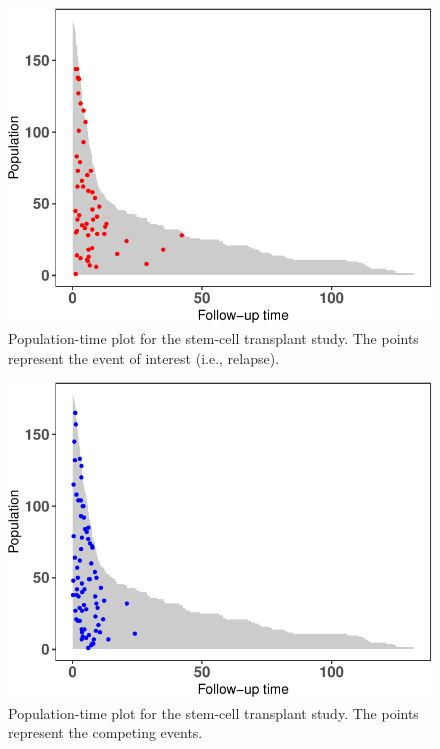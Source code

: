 \documentclass[
]{jss}
\begin{document}
\begin{CodeChunk}
\begin{figure}

{\centering \includegraphics{../figures/compPop1-1} 

}

\caption[Population-time plot for the stem-cell transplant study]{Population-time plot for the stem-cell transplant study. The points represent the event of interest (i.e., relapse).}\label{fig:compPop1}
\end{figure}
\end{CodeChunk}

\begin{CodeChunk}
\begin{figure}

{\centering \includegraphics{../figures/compPop2-1} 

}

\caption[Population-time plot for the stem-cell transplant study]{Population-time plot for the stem-cell transplant study. The points represent the competing events.}\label{fig:compPop2}
\end{figure}
\end{CodeChunk}
\end{document}
